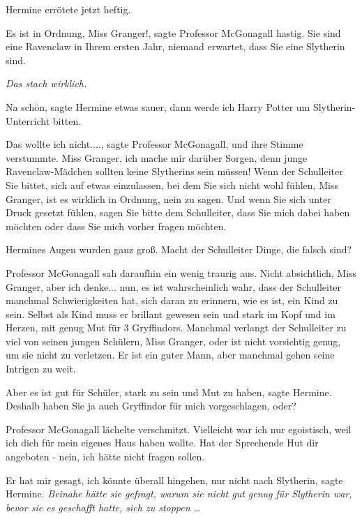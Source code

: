 Hermine errötete jetzt heftig.

\glqq{}Es ist in Ordnung, Miss Granger!\grqq{}, sagte Professor McGonagall
hastig. \glqq{}Sie sind eine Ravenclaw in Ihrem ersten Jahr, niemand erwartet,
dass Sie eine Slytherin sind.\grqq{}

\emph{Das stach wirklich.}

\glqq{}Na schön\grqq{}, sagte Hermine etwas sauer, \glqq{}dann werde ich Harry
Potter um Slytherin-Unterricht bitten.\grqq{}

\glqq{}Das wollte ich nicht....\grqq{}, sagte Professor McGonagall, und ihre
Stimme verstummte. \glqq{}Miss Granger, ich mache mir darüber Sorgen, denn junge
Ravenclaw-Mädchen sollten keine Slytherins sein müssen! Wenn der Schulleiter Sie
bittet, sich auf etwas einzulassen, bei dem Sie sich nicht wohl fühlen, Miss
Granger, ist es wirklich in Ordnung, nein zu sagen. Und wenn Sie sich unter
Druck gesetzt fühlen, sagen Sie bitte dem Schulleiter, dass Sie mich dabei haben
möchten oder dass Sie mich vorher fragen möchten.\grqq{}

Hermines Augen wurden ganz groß. \glqq{}Macht der Schulleiter Dinge, die falsch
sind?\grqq{}

Professor McGonagall sah daraufhin ein wenig traurig aus. \glqq{}Nicht
absichtlich, Miss Granger, aber ich denke... nun, es ist wahrscheinlich wahr,
dass der Schulleiter manchmal Schwierigkeiten hat, sich daran zu erinnern, wie
es ist, ein Kind zu sein. Selbst als Kind muss er brillant gewesen sein und
stark im Kopf und im Herzen, mit genug Mut für 3 Gryffindors. Manchmal verlangt
der Schulleiter zu viel von seinen jungen Schülern, Miss Granger, oder ist nicht
vorsichtig genug, um sie nicht zu verletzen. Er ist ein guter Mann, aber
manchmal gehen seine Intrigen zu weit.\grqq{}

\glqq{}Aber es ist gut für Schüler, stark zu sein und Mut zu haben\grqq{}, sagte
Hermine. \glqq{}Deshalb haben Sie ja auch Gryffindor für mich vorgeschlagen,
oder?\grqq{}

Professor McGonagall lächelte verschmitzt. \glqq{}Vielleicht war ich nur
egoistisch, weil ich dich für mein eigenes Haus haben wollte. Hat der Sprechende
Hut dir angeboten - nein, ich hätte nicht fragen sollen.\grqq{}

\glqq{}Er hat mir gesagt, ich könnte überall hingehen, nur nicht nach
Slytherin\grqq{}, sagte Hermine.
\emph{Beinahe hätte sie gefragt, warum sie nicht gut genug für Slytherin war,
bevor sie es geschafft hatte, sich zu stoppen …}

